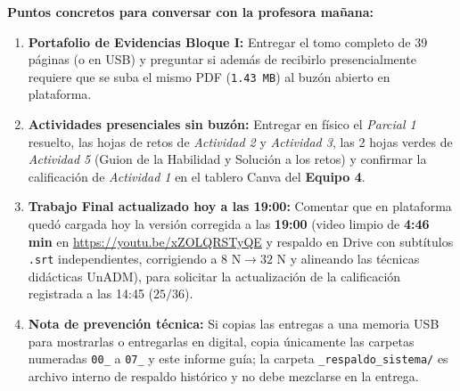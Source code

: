 \documentclass[spanish,letterpaper,oneside]{article}
\begin{document}
\begin{center}
\end{center}

\textbf{Puntos concretos para conversar con la profesora mañana:}
\begin{enumerate}[leftmargin=1.5em,itemsep=2pt]
  \item \textbf{Portafolio de Evidencias Bloque I:} Entregar el tomo completo de 39 páginas (o en USB) y preguntar si además de recibirlo presencialmente requiere que se suba el mismo PDF (\texttt{1.43 MB}) al buzón abierto en plataforma.
  \item \textbf{Actividades presenciales sin buzón:} Entregar en físico el \textit{Parcial 1} resuelto, las hojas de retos de \textit{Actividad 2} y \textit{Actividad 3}, las 2 hojas verdes de \textit{Actividad 5} (Guion de la Habilidad y Solución a los retos) y confirmar la calificación de \textit{Actividad 1} en el tablero Canva del \textbf{Equipo 4}.
  \item \textbf{Trabajo Final actualizado hoy a las 19:00:} Comentar que en plataforma quedó cargada hoy la versión corregida a las \textbf{19:00} (video limpio de \textbf{4:46 min} en \url{https://youtu.be/xZOLQRSTyQE} y respaldo en Drive con subtítulos \texttt{.srt} independientes, corrigiendo a $8\text{ N} \to 32\text{ N}$ y alineando las técnicas didácticas UnADM), para solicitar la actualización de la calificación registrada a las 14:45 ($25/36$).
  \item \textbf{Nota de prevención técnica:} Si copias las entregas a una memoria USB para mostrarlas o entregarlas en digital, copia únicamente las carpetas numeradas \texttt{00\_} a \texttt{07\_} y este informe guía; la carpeta \texttt{\_respaldo\_sistema/} es archivo interno de respaldo histórico y no debe mezclarse en la entrega.
\end{enumerate}
\end{document}
